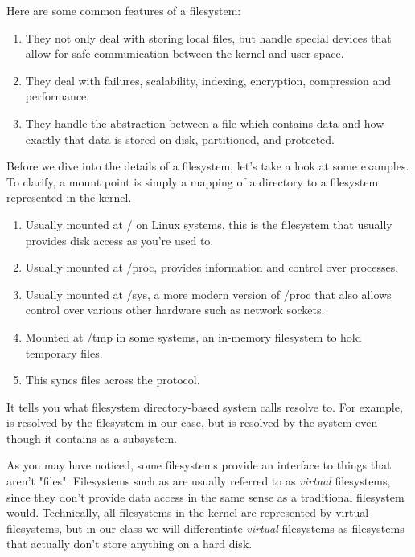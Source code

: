 Here are some common features of a filesystem:

\begin{enumerate}
    \item They not only deal with storing local files, but handle special devices that allow for safe communication between the kernel and user space.
    \item They deal with failures, scalability, indexing, encryption, compression and performance.
    \item They handle the abstraction between a file which contains data and how exactly that data is stored on disk, partitioned, and protected.
\end{enumerate}

Before we dive into the details of a filesystem, let's take a look at some examples.
To clarify, a mount point is simply a mapping of a directory to a filesystem represented in the kernel.

\begin{enumerate}
  \item {} Usually mounted at / on Linux systems, this is the filesystem that usually provides disk access as you're used to.
  \item {} Usually mounted at /proc, provides information and control over processes.
  \item {} Usually mounted at /sys, a more modern version of /proc that also allows control over various other hardware such as network sockets.
  \item {} Mounted at /tmp in some systems, an in-memory filesystem to hold temporary files.
  \item {} This syncs files across the  protocol.
\end{enumerate}

It tells you what filesystem directory-based system calls resolve to.
For example, \keyword{/} is resolved by the  filesystem in our case, but  is resolved by the  system even though it contains \keyword{/} as a subsystem.

As you may have noticed, some filesystems provide an interface to things that aren't "files".
Filesystems such as  are usually referred to as \emph{virtual} filesystems, since they don't provide data access in the same sense as a traditional filesystem would.
Technically, all filesystems in the kernel are represented by virtual filesystems, but in our class we will differentiate \emph{virtual} filesystems as filesystems that actually don't store anything on a hard disk.

